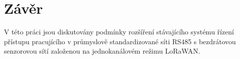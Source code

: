 \chapter{Závěr}

V této práci jsou diskutovány podmínky rozšíření stávajícího systému řízení přístupu pracujícího v průmyslově standardizované síti RS485 s bezdrátovou senzorovou sítí založenou na jednokanálovém režimu LoRaWAN.
 



